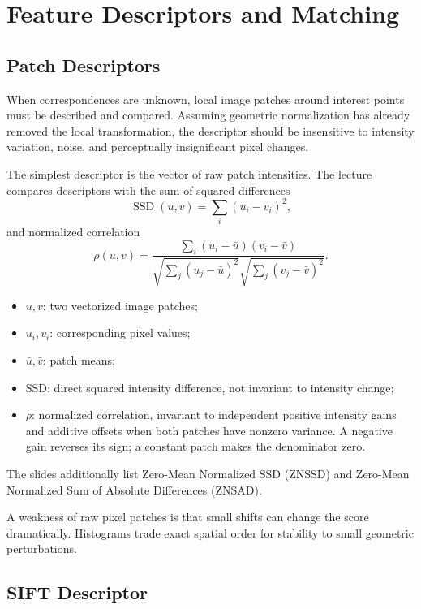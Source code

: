 \documentclass[11pt,a4paper,oneside]{report}
\newcommand{\mathlegend}[1]{%
  \par\vspace{0.2em}{\small\itshape where}\par
  \begin{itemize}[leftmargin=1.7em,topsep=0.15em,itemsep=0.12em]
  #1
  \end{itemize}
}
\begin{document}
\chapter{Feature Descriptors and Matching}

\section{Patch Descriptors}

When correspondences are unknown, local image patches around interest points must be described and compared. Assuming geometric normalization has already removed the local transformation, the descriptor should be insensitive to intensity variation, noise, and perceptually insignificant pixel changes.

The simplest descriptor is the vector of raw patch intensities. The lecture compares descriptors with the sum of squared differences
\begin{equation}
  \operatorname{SSD}(u,v)=\sum_i(u_i-v_i)^2,
  \label{eq:ssd-descriptor}
\end{equation}
and normalized correlation
\begin{equation}
  \rho(u,v)=
  \frac{\sum_i(u_i-\bar{u})(v_i-\bar{v})}
  {\sqrt{\sum_j(u_j-\bar{u})^2}\sqrt{\sum_j(v_j-\bar{v})^2}}.
  \label{eq:normalized-correlation}
\end{equation}
\mathlegend{
  \item $u,v$: two vectorized image patches;
  \item $u_i,v_i$: corresponding pixel values;
  \item $\bar{u},\bar{v}$: patch means;
  \item SSD: direct squared intensity difference, not invariant to intensity change;
  \item $\rho$: normalized correlation, invariant to independent positive intensity gains and additive offsets when both patches have nonzero variance. A negative gain reverses its sign; a constant patch makes the denominator zero.
}
The slides additionally list Zero-Mean Normalized SSD (ZNSSD) and Zero-Mean Normalized Sum of Absolute Differences (ZNSAD).

A weakness of raw pixel patches is that small shifts can change the score dramatically. Histograms trade exact spatial order for stability to small geometric perturbations.

\section{SIFT Descriptor}
\end{document}
